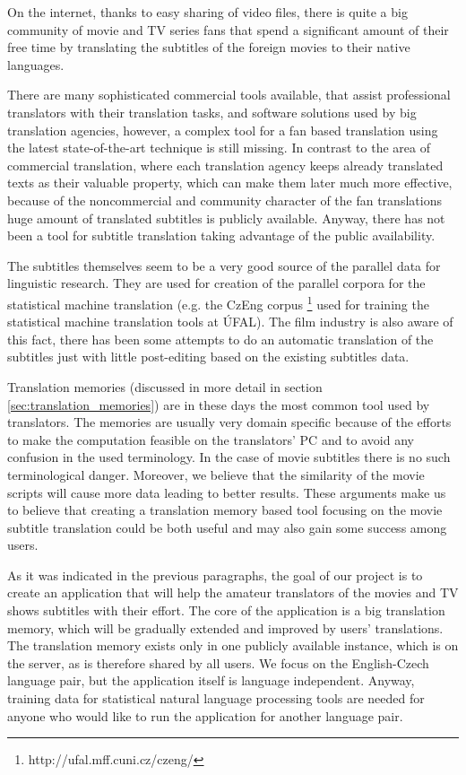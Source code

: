 On the internet, thanks to easy sharing of video files, there is quite a big community of movie and TV series fans that spend a significant amount of their free time by translating the subtitles of the foreign movies to their native languages. 

There are many sophisticated commercial tools available, that assist professional translators with their translation tasks, and software solutions used by big translation agencies, however, a complex tool for a fan based translation using the latest state-of-the-art technique is still missing. In contrast to the area of commercial translation, where each translation agency keeps already translated texts as their valuable property, which can make them later much more effective, because of the noncommercial and community character of the fan translations huge amount of translated subtitles is publicly available. Anyway, there has not been a tool for subtitle translation taking advantage of the public availability.

The subtitles themselves seem to be a very good source of the parallel data for linguistic research. They are used for creation of the parallel corpora for the statistical machine translation (e.g. the CzEng corpus \footnote{http://ufal.mff.cuni.cz/czeng/} used for training the statistical machine translation tools at ÚFAL). The film industry is also aware of this fact, there has been some attempts to do an automatic translation of the subtitles just with little post-editing based on the existing subtitles data.

Translation memories (discussed in more detail in section \ref{sec:translation_memories}) are in these days the most common tool used by translators. The memories are usually very domain specific because of the efforts to make the computation feasible on the translators' PC and to avoid any confusion in the used terminology. In the case of movie subtitles there is no such terminological danger. Moreover, we believe that the similarity of the movie scripts will cause more data leading to better results. These arguments make us to believe that creating a translation memory based tool focusing on the movie subtitle translation could be both useful and may also gain some success among users.

As it was indicated in the previous paragraphs, the goal of our project is to create an application that will help the amateur translators of the movies and TV shows subtitles with their effort. The core of the application is a big translation memory, which will be gradually extended and improved by users' translations. The translation memory exists only in one publicly available instance, which is on the server, as is therefore shared by all users. We focus on the English-Czech language pair, but the application itself is language independent. Anyway, training data for statistical natural language processing tools are needed for anyone who would like to run the application for another language pair.

